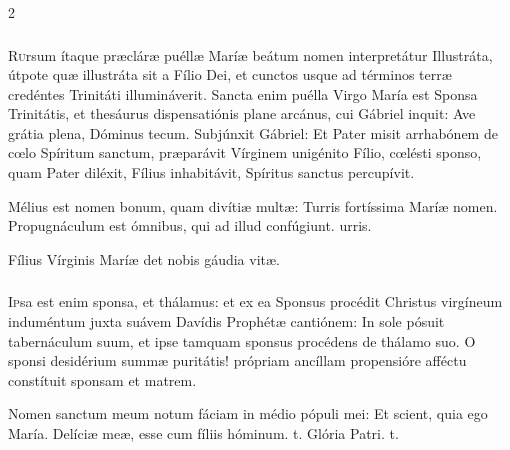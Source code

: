 \documentclass[9pt,twoside]{extarticle}
\begin{document}
\begin{multicols}{2}
\subsubsection*{\center {}}
\lettrine{R}ursum ítaque præcláræ puéllæ Maríæ beátum nomen interpretátur Illustráta, útpote quæ illustráta sit a Fílio Dei, et cunctos usque ad términos terræ credéntes Trinitáti illumináverit. Sancta enim puélla Virgo María est Sponsa Trinitátis, et thesáurus dispensatiónis plane arcánus, cui Gábriel inquit: Ave grátia plena, Dóminus tecum. Subjúnxit Gábriel: Et Pater misit arrhabónem de cœlo Spíritum sanctum, præparávit Vírginem unigénito Fílio, cœlésti sponso, quam Pater diléxit, Fílius inhabitávit, Spíritus sanctus percupívit.

\begin{tightlist}{}
\item {} Mélius est nomen bonum, quam divítiæ multæ: \textred{*} Turris fortíssima Maríæ nomen.  Propugnáculum est ómnibus, qui ad illud confúgiunt. urris.
\item {\small {} Fílius Vírginis Maríæ det nobis gáudia vitæ.}
\end{tightlist}

\subsubsection*{\center {}}
\lettrine{I}psa est enim sponsa, et thálamus: et ex ea Sponsus procédit Christus virgíneum induméntum juxta suávem Davídis Prophétæ cantiónem: In sole pósuit tabernáculum suum, et ipse tamquam sponsus procédens de thálamo suo. O sponsi desidérium summæ puritátis! própriam ancíllam propensióre afféctu constítuit sponsam et matrem.

\begin{tightlist}{}
\item {} Nomen sanctum meum notum fáciam in médio pópuli mei: \textred{*} Et scient, quia ego María.  Delíciæ meæ, esse cum fíliis hóminum. t. Glória Patri. t.
\end{tightlist}


\end{multicols}
\end{document}
